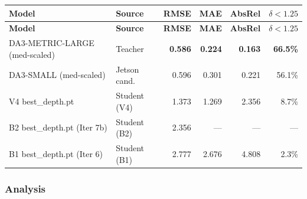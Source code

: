 \documentclass[11pt,a4paper]{article}
\begin{document}
\begin{longtable}{llrrrr}
\toprule
\textbf{Model} & \textbf{Source} & \textbf{RMSE} & \textbf{MAE} & \textbf{AbsRel} & \textbf{$\delta < 1.25$} \\
\midrule
\endfirsthead
\toprule
\textbf{Model} & \textbf{Source} & \textbf{RMSE} & \textbf{MAE} & \textbf{AbsRel} & \textbf{$\delta < 1.25$} \\
\midrule
\endhead
DA3-METRIC-LARGE (med-scaled) & Teacher & \textbf{0.586} & \textbf{0.224} & \textbf{0.163} & \textbf{66.5\%} \\
DA3-SMALL (med-scaled)        & Jetson cand. & 0.596 & 0.301 & 0.221 & 56.1\% \\
V4 best\_depth.pt             & Student (V4)   & 1.373 & 1.269 & 2.356 &  8.7\% \\
B2 best\_depth.pt (Iter 7b)   & Student (B2)   & 2.356 & --- & --- & --- \\
B1 best\_depth.pt (Iter 6)    & Student (B1)   & 2.777 & 2.676 & 4.808 &  2.3\% \\
\bottomrule
\end{longtable}

\subsubsection{Analysis}
\end{document}
